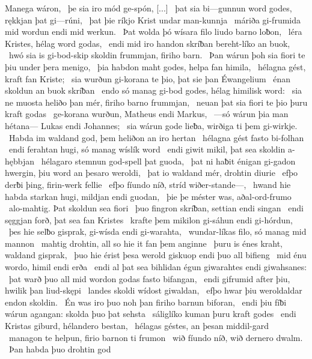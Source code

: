 
Manega wáron, \hld\ þe sia iro mód ge-spón,
[...] \hld\ þat sia bi—gunnun word godes,
rękkjan þat gi—rúni, \hld\ þat þie ríkjo Krist
undar man-kunnja \hld\ máriða gi-frumida
mid wordun endi mid werkun. \hld\ Þat wolda þó wísara filo
liudo barno loƀon, \hld\ léra Kristes,
hélag word godas, \hld\ endi mid iro handon skríƀan
bereht-líko an buok, \hld\ hwó sia is gi-bod-skip skoldin
frummjan, firiho barn. \hld\ Þan wárun þoh sia fiori te þiu
under þera menigo, \hld\ þia habdon maht godes,
helpa fan himila, \hld\ hélagna gést,
kraft fan Kriste; \hld\ sia wurðun gi-korana te þio,
þat sie þan Éwangelium \hld\ énan skoldun
an buok skríƀan \hld\ endo só manag gi-bod godes,
hélag himilisk word: \hld\ sia ne muosta heliðo þan mér,
firiho barno frummjan, \hld\ neuan þat sia fiori te þio
þuru kraft godas \hld\ ge-korana wurðun,
Matheus endi Markus, \hld\ —só wárun þia man hétana—
Lukas endi Johannes; \hld\ sia wárun gode lieƀa,
wirðiga ti þem gi-wirkje. \hld\ Habda im waldand god,
þem heliðon an iro hertan \hld\ hélagna gést
fasto bi-folhan \hld\ endi ferahtan hugi,
só manag wíslík word \hld\ endi giwit mikil,
þat sea skoldin a-hębbjan \hld\ hélagaro stemnun
god-spell þat guoda, \hld\ þat ni haƀit énigan gi-gadon hwergin,
þiu word an þesaro weroldi, \hld\ þat io waldand mér,
drohtin diurie \hld\ efþo derƀi þing,
firin-werk fellie \hld\ efþo fíundo níð,
stríd wiðer-stande—, \hld\ hwand hie habda starkan hugi,
mildjan endi guodan, \hld\ þie þe méster was,
aðal-ord-frumo \hld\ alo-mahtig.
Þat skoldun sea fiori \hld\ þuo fingron skríƀan,
settian endi singan \hld\ endi sęggjan forð,
þat sea fan Kristes \hld\ krafte þem mikilon
gi-sáhun endi gi-hórdun, \hld\ þes hie selƀo gisprak,
gi-wísda endi gi-warahta, \hld\ wundar-líkas filo,
só manag mid mannon \hld\ mahtig drohtin,
all so hie it fan þem anginne \hld\ þuru is énes kraht,
waldand gisprak, \hld\ þuo hie érist þesa werold giskuop
endi þuo all bifieng \hld\ mid énu wordo,
himil endi erða \hld\ endi al þat sea bihlidan égun
giwarahtes endi giwahsanes: \hld\ þat warð þuo all mid wordon godas
fasto bifangan, \hld\ endi gifrumid after þiu,
hwilik þan liud-skępi \hld\ landes skoldi
wídost giwaldan, \hld\ efþo hwar þiu weroldaldar
endon skoldin. \hld\ Én was iro þuo noh þan
firiho barnun biforan, \hld\ endi þiu fíƀi wárun agangan:
skolda þuo þat sehsta \hld\ sáliglíko
kuman þuru kraft godes \hld\  endi Kristas giburd,
hélandero bestan, \hld\ hélagas géstes,
an þesan middil-gard \hld\ managon te helpun,
firio barnon ti frumon \hld\ wið fíundo níð,
wið dernero dwalm. \hld\ Þan habda þuo drohtin god

